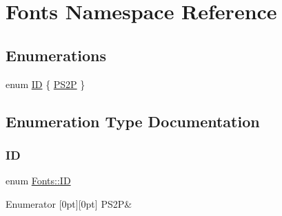 \hypertarget{namespace_fonts}{}\section{Fonts Namespace Reference}
\label{namespace_fonts}
\subsection*{Enumerations}
\begin{DoxyCompactItemize}
\item 
enum \hyperlink{namespace_fonts_a240717ec0dc75e98501af734a02c396d}{ID} \{ \hyperlink{namespace_fonts_a240717ec0dc75e98501af734a02c396dab947c11fcf1d458feb7709e9c3733e65}{P\+S2P}
 \}
\end{DoxyCompactItemize}


\subsection{Enumeration Type Documentation}
\mbox{\label{namespace_fonts_a240717ec0dc75e98501af734a02c396d}} 
\subsubsection{\texorpdfstring{ID}{ID}}
{\footnotesize\ttfamily enum \hyperlink{namespace_fonts_a240717ec0dc75e98501af734a02c396d}{Fonts\+::\+ID}}

\begin{DoxyEnumFields}{Enumerator}
[0pt][0pt]{}\mbox{\label{namespace_fonts_a240717ec0dc75e98501af734a02c396dab947c11fcf1d458feb7709e9c3733e65}} 
P\+S2P&\\
\hline

\end{DoxyEnumFields}
